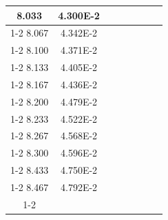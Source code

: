 \documentclass[article,12pt]{elsarticle}
\begin{document}
\begin{longtable}[c]{|c|c|cccccc}
8.033    & 4.300E-2  &                       &                              &                            &                       &                              &                               \\ \cline{1-2}
8.067    & 4.342E-2  &                       &                              &                            &                       &                              &                               \\ \cline{1-2}
8.100    & 4.371E-2  &                       &                              &                            &                       &                              &                               \\ \cline{1-2}
8.133    & 4.405E-2  &                       &                              &                            &                       &                              &                               \\ \cline{1-2}
8.167    & 4.436E-2  &                       &                              &                            &                       &                              &                               \\ \cline{1-2}
8.200    & 4.479E-2  &                       &                              &                            &                       &                              &                               \\ \cline{1-2}
8.233    & 4.522E-2  &                       &                              &                            &                       &                              &                               \\ \cline{1-2}
8.267    & 4.568E-2  &                       &                              &                            &                       &                              &                               \\ \cline{1-2}
8.300    & 4.596E-2  &                       &                              &                            &                       &                              &                               \\ \cline{1-2}
8.433    & 4.750E-2  &                       &                              &                            &                       &                              &                               \\ \cline{1-2}
8.467    & 4.792E-2  &                       &                              &                            &                       &                              &                               \\ \cline{1-2}

\end{longtable}
\end{document}
